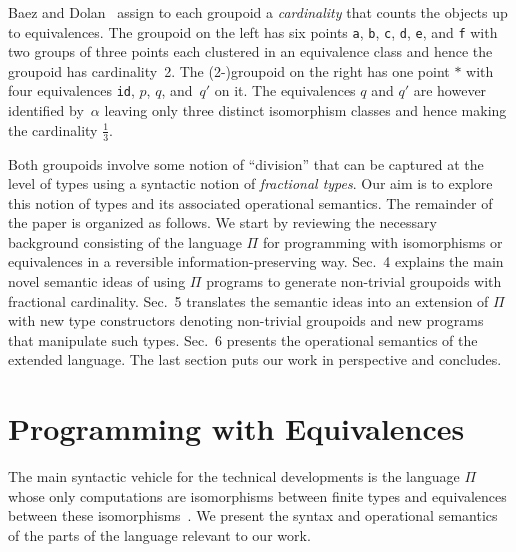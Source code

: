 \documentclass[a4paper,USenglish]{lipics-v2016-utf8x}
\begin{document}
\medskip\noindent Baez and Dolan~\cite{groupoidcard} assign to each groupoid a
\emph{cardinality} that counts the objects up to equivalences. The groupoid on
the left has six points \texttt{a}, \texttt{b}, \texttt{c}, \texttt{d},
\texttt{e}, and \texttt{f} with two groups of three points each clustered in an
equivalence class and hence the groupoid has cardinality~2. The (2-)groupoid on
the right has one point $\ast$ with four equivalences \texttt{id}, $p$, $q$,
and~$q'$ on it. The equivalences $q$ and $q'$ are however identified by~$\alpha$
leaving only three distinct isomorphism classes and hence making the cardinality
$\frac{1}{3}$.

Both groupoids involve some notion of ``division'' that can be captured at the
level of types using a syntactic notion of \emph{fractional types}. Our aim is
to explore this notion of types and its associated operational semantics. The
remainder of the paper is organized as follows. We start by reviewing the
necessary background consisting of the language $\Pi$ for programming with
isomorphisms or equivalences in a reversible information-preserving way. Sec.~4
explains the main novel semantic ideas of using $\Pi$ programs to generate
non-trivial groupoids with fractional cardinality. Sec.~5 translates the
semantic ideas into an extension of $\Pi$ with new type constructors denoting
non-trivial groupoids and new programs that manipulate such types. Sec.~6
presents the operational semantics of the extended language. The last section
puts our work in perspective and concludes.

\section{Programming with Equivalences}
\label{sec:pi}

The main syntactic vehicle for the technical developments
is the language $\Pi$ whose only computations are isomorphisms
between finite types and equivalences between these
isomorphisms~\cite{Carette2016,James:2012:IE:2103656.2103667}. We
present the syntax and operational semantics of the parts of the
language relevant to our work.
\end{document}
